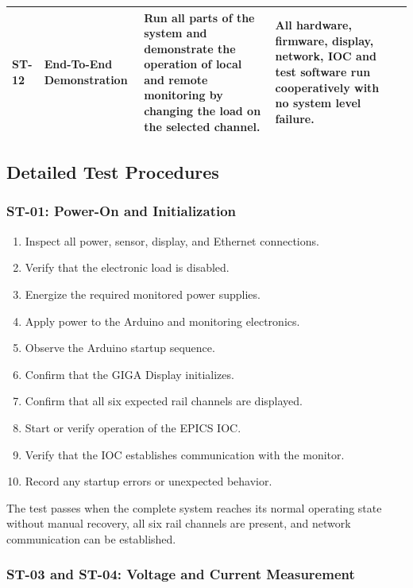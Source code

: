 \begin{Form}
\begin{longtable}{
			p{}
			p{}
			p{}
			p{}
			p{}
		}
		\addlinespace[0.4em]
		
		ST-12 &
		End-To-End Demonstration &
		Run all parts of the system and demonstrate the operation of local and remote
		monitoring by changing the load on the selected channel. &
		All hardware, firmware, display, network, IOC and test software run
		cooperatively with no system level failure. &
		\testresult{ST12} \\
		
		\bottomrule
	\end{longtable}
	
\end{Form}
\newpage
\subsection{Detailed Test Procedures}

\subsubsection{ST-01: Power-On and Initialization}

\begin{enumerate}
	\item Inspect all power, sensor, display, and Ethernet connections.
	\item Verify that the electronic load is disabled.
	\item Energize the required monitored power supplies.
	\item Apply power to the Arduino and monitoring electronics.
	\item Observe the Arduino startup sequence.
	\item Confirm that the GIGA Display initializes.
	\item Confirm that all six expected rail channels are displayed.
	\item Start or verify operation of the EPICS IOC.
	\item Verify that the IOC establishes communication with the monitor.
	\item Record any startup errors or unexpected behavior.
\end{enumerate}

The test passes when the complete system reaches its normal operating state without
manual recovery, all six rail channels are present, and network communication can
be established.

\subsubsection{ST-03 and ST-04: Voltage and Current Measurement}

